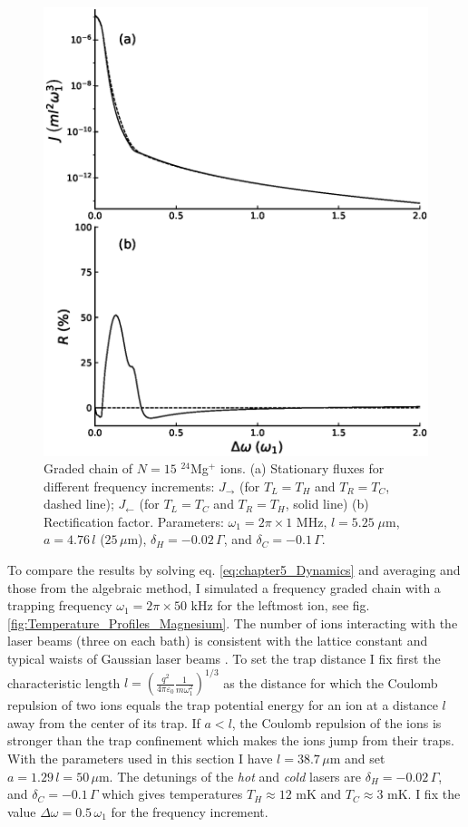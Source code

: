 \begin{figure}
  \center
  \includegraphics[width=0.85\linewidth]{Figures/Graded_24Mg_FluxAndRectification_VS_FreqGradient.eps}
  \caption{Graded chain of $N=15$ $^{24}$Mg$^+$ ions. (a) Stationary fluxes for different frequency increments: $J_\rightarrow$   (for $T_L = T_H$ and $T_R = T_C$, dashed line); $J_\leftarrow$ (for $T_L = T_C$ and $T_R = T_H$, solid line) (b) Rectification factor. Parameters: $\omega_1 = 2 \pi \times 1$ MHz, $l = 5.25\;\mu$m, $a = 4.76\, l$ ($25\,\mu$m), $\delta_H = -0.02 \,\Gamma$, and $\delta_C = -0.1 \, \Gamma$.}
  \label{fig:RFG}
\end{figure}

To compare the results by solving eq. \eqref{eq:chapter5_Dynamics} and averaging and those from the algebraic method, I simulated a frequency graded chain with a trapping frequency $\omega_1 = 2\pi \times 50$ kHz for the leftmost ion, see fig. \ref{fig:Temperature_Profiles_Magnesium}.  The number of ions interacting with the laser beams (three on each bath) is consistent with the lattice constant and typical waists of Gaussian laser beams \cite{Leupold2015,Lo2015}. To set the trap distance I fix first the characteristic length  $l =  \left(\frac{q^2}{4\pi\varepsilon_0}\frac{1}{m\omega_1^2}\right)^{1/3}$ as the distance for which the Coulomb repulsion of two ions equals the trap  potential energy for an ion at a distance
$l$ away from the center of its trap.
If $a<l$, the Coulomb repulsion of the ions is stronger than the trap confinement which makes the ions jump from their traps. With the parameters used in this section I have $l = 38.7\,\mu$m and set $a = 1.29 \,l=50\,\mu$m. The detunings of the \textit{hot} and \textit{cold} lasers are $\delta_H = -0.02 \, \Gamma$, and $\delta_C = -0.1 \, \Gamma$ which gives temperatures $T_H \approx 12$ mK and $T_C \approx 3$ mK. I fix the value $\Delta\omega = 0.5 \, \omega_1$ for the frequency increment.

